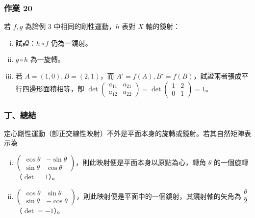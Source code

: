 \subsubsection*{作業 20}
若 $f, g$ 為論例 3 中相同的剛性運動，$h$ 表對 $X$ 軸的鏡射：
\begin{enumerate}[(i)]
  \item 試證：$h \circ f$ 仍為一鏡射。
  \item $g \circ h$ 為一旋轉。
  \item 若 $A = (1, 0), B = (2, 1)$，而 $A' = f(A), B' = f(B)$，試證兩者張成平行四邊形面積相等，卽 $\det\begin{pmatrix} a_{11} & a_{21} \\ a_{12} & a_{22} \end{pmatrix} = \det\begin{pmatrix} 1 & 2 \\ 0 & 1 \end{pmatrix} = 1$。
\end{enumerate}

\subsubsection*{丁、總結}

\begin{theorem}[定理 7]
定心剛性運動（卽正交線性映射）不外是平面本身的旋轉或鏡射。若其自然矩陣表示為
\begin{enumerate}[(i)]
  \item $\begin{pmatrix} \cos\theta & -\sin\theta \\ \sin\theta & \cos\theta \end{pmatrix}$，則此映射便是平面本身以原點為心，轉角 $\theta$ 的一個旋轉（$\det = 1$）。
  \item $\begin{pmatrix} \cos\theta & \sin\theta \\ \sin\theta & -\cos\theta \end{pmatrix}$，則此映射便是平面中的一個鏡射，其鏡射軸的矢角為 $\dfrac{\theta}{2}$（$\det = -1$）。
\end{enumerate}
\end{theorem}

